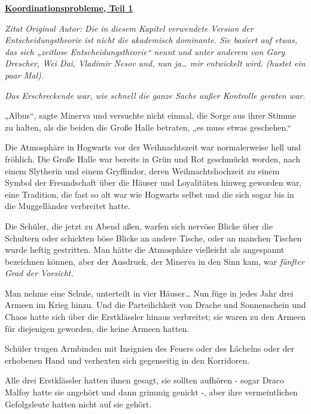 

\hypertarget{koordinationsprobleme-teil-1}{%

\textbf{\uline{Koordinationsprobleme, Teil 1}}

\emph{Zitat Original Autor: Die in diesem Kapitel verwendete Version der Entscheidungstheorie ist nicht die akademisch dominante. Sie basiert auf etwas, das sich „zeitlose Entscheidungstheorie“ nennt und unter anderem von Gary Drescher, Wei Dai, Vladimir Nesov und, nun ja… mir entwickelt wird. (hustet ein paar Mal).}

\emph{Das Erschreckende war, wie schnell die ganze Sache außer Kontrolle geraten war.}

„Albus“, sagte Minerva und versuchte nicht einmal, die Sorge aus ihrer Stimme zu halten, als die beiden die Große Halle betraten, „es muss etwas geschehen.“

Die Atmosphäre in Hogwarts vor der Weihnachtszeit war normalerweise hell und fröhlich. Die Große Halle war bereits in Grün und Rot geschmückt worden, nach einem Slytherin und einem Gryffindor, deren Weihnachtshochzeit zu einem Symbol der Freundschaft über die Häuser und Loyalitäten hinweg geworden war, eine Tradition, die fast so alt war wie Hogwarts selbst und die sich sogar bis in die Muggelländer verbreitet hatte.

Die Schüler, die jetzt zu Abend aßen, warfen sich nervöse Blicke über die Schultern oder schickten böse Blicke an andere Tische, oder an manchen Tischen wurde heftig gestritten. Man hätte die Atmosphäre vielleicht als angespannt bezeichnen können, aber der Ausdruck, der Minerva in den Sinn kam, war \emph{fünfter Grad der Vorsicht.}

Man nehme eine Schule, unterteilt in vier Häuser… Nun füge in jedes Jahr drei Armeen im Krieg hinzu. Und die Parteilichkeit von Drache und Sonnenschein und Chaos hatte sich über die Erstklässler hinaus verbreitet; sie waren zu den Armeen für diejenigen geworden, die keine Armeen hatten.

Schüler trugen Armbinden mit Insignien des Feuers oder des Lächelns oder der erhobenen Hand und verhexten sich gegenseitig in den Korridoren.

Alle drei Erstklässler hatten ihnen gesagt, sie sollten aufhören - sogar Draco Malfoy hatte sie angehört und dann grimmig genickt -, aber ihre vermeintlichen Gefolgsleute hatten nicht auf sie gehört.

}
